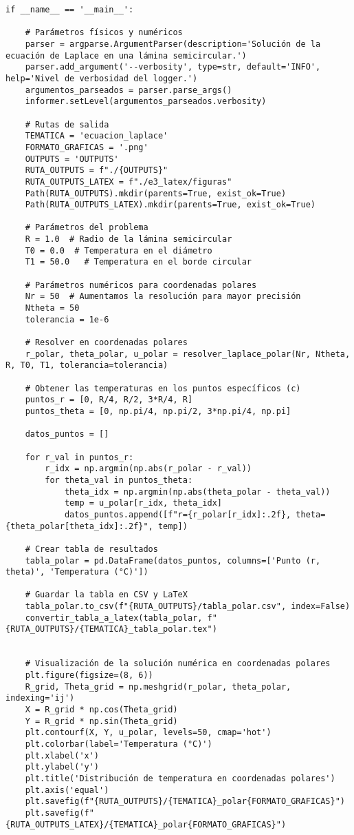 \begin{verbatim}
if __name__ == '__main__':
    
    # Parámetros físicos y numéricos
    parser = argparse.ArgumentParser(description='Solución de la ecuación de Laplace en una lámina semicircular.')
    parser.add_argument('--verbosity', type=str, default='INFO', help='Nivel de verbosidad del logger.')
    argumentos_parseados = parser.parse_args()
    informer.setLevel(argumentos_parseados.verbosity)

    # Rutas de salida
    TEMATICA = 'ecuacion_laplace'
    FORMATO_GRAFICAS = '.png'
    OUTPUTS = 'OUTPUTS'
    RUTA_OUTPUTS = f"./{OUTPUTS}"
    RUTA_OUTPUTS_LATEX = f"./e3_latex/figuras"
    Path(RUTA_OUTPUTS).mkdir(parents=True, exist_ok=True)
    Path(RUTA_OUTPUTS_LATEX).mkdir(parents=True, exist_ok=True)

    # Parámetros del problema
    R = 1.0  # Radio de la lámina semicircular
    T0 = 0.0  # Temperatura en el diámetro
    T1 = 50.0   # Temperatura en el borde circular

    # Parámetros numéricos para coordenadas polares
    Nr = 50  # Aumentamos la resolución para mayor precisión
    Ntheta = 50
    tolerancia = 1e-6

    # Resolver en coordenadas polares
    r_polar, theta_polar, u_polar = resolver_laplace_polar(Nr, Ntheta, R, T0, T1, tolerancia=tolerancia)

    # Obtener las temperaturas en los puntos específicos (c)
    puntos_r = [0, R/4, R/2, 3*R/4, R]
    puntos_theta = [0, np.pi/4, np.pi/2, 3*np.pi/4, np.pi]

    datos_puntos = []

    for r_val in puntos_r:
        r_idx = np.argmin(np.abs(r_polar - r_val))
        for theta_val in puntos_theta:
            theta_idx = np.argmin(np.abs(theta_polar - theta_val))
            temp = u_polar[r_idx, theta_idx]
            datos_puntos.append([f"r={r_polar[r_idx]:.2f}, theta={theta_polar[theta_idx]:.2f}", temp])

    # Crear tabla de resultados
    tabla_polar = pd.DataFrame(datos_puntos, columns=['Punto (r, theta)', 'Temperatura (°C)'])

    # Guardar la tabla en CSV y LaTeX
    tabla_polar.to_csv(f"{RUTA_OUTPUTS}/tabla_polar.csv", index=False)
    convertir_tabla_a_latex(tabla_polar, f"{RUTA_OUTPUTS}/{TEMATICA}_tabla_polar.tex")


    # Visualización de la solución numérica en coordenadas polares
    plt.figure(figsize=(8, 6))
    R_grid, Theta_grid = np.meshgrid(r_polar, theta_polar, indexing='ij')
    X = R_grid * np.cos(Theta_grid)
    Y = R_grid * np.sin(Theta_grid)
    plt.contourf(X, Y, u_polar, levels=50, cmap='hot')
    plt.colorbar(label='Temperatura (°C)')
    plt.xlabel('x')
    plt.ylabel('y')
    plt.title('Distribución de temperatura en coordenadas polares')
    plt.axis('equal')
    plt.savefig(f"{RUTA_OUTPUTS}/{TEMATICA}_polar{FORMATO_GRAFICAS}")
    plt.savefig(f"{RUTA_OUTPUTS_LATEX}/{TEMATICA}_polar{FORMATO_GRAFICAS}")


\end{verbatim}
